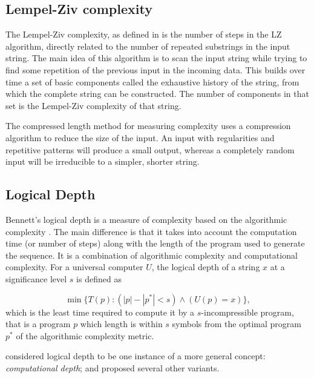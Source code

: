 \subsection{Lempel-Ziv complexity}\label{subsection:lempel-ziv}
The Lempel-Ziv complexity, as defined in
\parencite{lempelComplexityFiniteSequences1976} is the number of steps in the LZ
algorithm, directly related to the number of repeated substrings in the
input string. The main idea of this algorithm is to scan the input string while
trying to find some repetition of the previous input in the incoming data. This
builds over time a set of basic components called the exhaustive history of the
string, from which the complete string can be constructed. The number of
components in that set is the Lempel-Ziv complexity of that string.

The compressed length method for measuring complexity uses a compression
algorithm to reduce the size of the input. An input with regularities and
repetitive patterns will produce a small output, whereas a completely random
input will be irreducible to a simpler, shorter string.


\subsection{Logical Depth}

Bennett's logical depth is a measure of complexity based on the algorithmic
complexity \parencite{bennettDissipationInformationComputational1988,
  bennettLogicalDepthPhysical1995}. The main difference is that it takes into
account the computation time (or number of steps) along with the length of the
program used to generate the sequence. It is a combination of algorithmic
complexity and computational complexity. For a universal computer $U$, the
logical depth of a string $x$ at a significance level $s$ is defined as

\begin{equation}
  \label{eq:2}
  \min\{T(p): (|p| - |p^{*}| < s ) \wedge (U(p) = x) \},
\end{equation}
which is the least time required to compute it by a $s$-incompressible program,
that is a program $p$ which length is within $s$ symbols from the optimal program
$p^{*}$ of the algorithmic complexity metric.

\textcite{antunesComputationalDepthConcept2006} considered logical depth to be
one instance of a more general concept: \emph{computational depth}; and proposed
several other variants.

